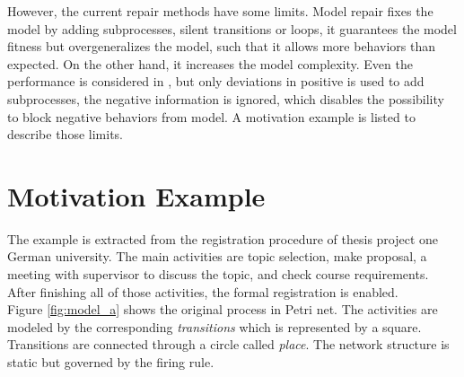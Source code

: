 However, the current repair methods have some limits. Model repair fixes the model by adding subprocesses, silent transitions or loops, it guarantees the model fitness but overgeneralizes the model, such that it allows more behaviors than expected. On the other hand, it increases the model complexity.  Even the performance is considered in \cite{dees2017enhancing}, but only deviations in positive is used to add subprocesses, the negative information is ignored, which disables the possibility to block negative behaviors from model.  A motivation example is listed to describe those limits.
\section{Motivation Example}
The example is extracted from the registration procedure of thesis project one German university. The main activities are topic selection, make proposal, a meeting with supervisor to discuss the topic, and check course requirements. After finishing all of those activities, the formal registration is enabled. \\
Figure \ref{fig:model_a} shows the original process in Petri net. The activities are modeled by the corresponding \emph{transitions} which is represented by a square. Transitions are connected through a circle called \emph{place}. The network structure is static but governed by the firing rule. 

